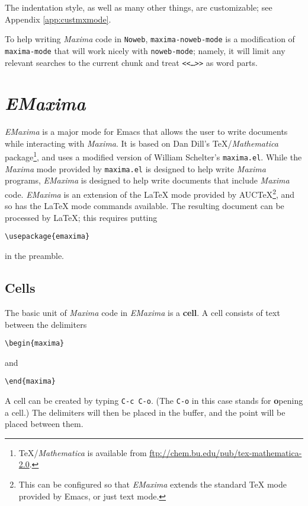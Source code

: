 \documentclass{article}
\newcommand{\emx}{\textsl{\sffamily EMaxima}}
\newcommand{\mx}{\textsl{\sffamily Maxima}}
\newcommand{\hyph}{-\hspace{0pt}}
\begin{document}
The indentation style, as well as many other things, are customizable;
see Appendix \ref{app:custmxmode}.

To help writing \mx{} code in \texttt{Noweb},
\texttt{maxima\hyph{}noweb\hyph{}mode} is a modification of \texttt{maxima\hyph{}mode}
that will work nicely with \texttt{noweb\hyph{}mode}; namely, it will limit
any relevant searches to the current chunk and treat
\texttt{<<\ldots>>} as word parts.

\section{\emx}

\emx{} is a major mode for Emacs that allows the user to write
documents while interacting with \mx.  It is based on Dan Dill's
\TeX{}/\textit{Mathematica} package\footnote{\TeX/\textit{Mathematica}
  is available from \url{ftp://chem.bu.edu/pub/tex-mathematica-2.0}.},
and uses a modified version of William Schelter's \texttt{maxima.el}.
While the \mx{} mode provided by \texttt{maxima.el} is designed to
help write \mx{} programs, \emx{} is designed to help write documents
that include \mx{} code.  \emx{} is an extension of the \LaTeX{} mode
provided by AUC\TeX{}\footnote{This can be configured so that \emx{}
  extends the standard \TeX{} mode provided by Emacs, or just text
  mode.}, and so has the \LaTeX{} mode commands available.  The
resulting document can be processed by \LaTeX{}; this requires putting
\begin{verbatim}
\usepackage{emaxima}
\end{verbatim}
\noindent
in the preamble.

\subsection{Cells}

The basic unit of \mx{} code in \emx{} is a \textbf{cell}.  A cell
consists of text between the delimiters
\begin{verbatim}
\begin{maxima}
\end{verbatim}
\noindent
and
\begin{verbatim}
\end{maxima}
\end{verbatim}
\noindent
A cell can be created by typing \texttt{C-c C-o}.  (The \texttt{C-o} in this
case stands for \textbf{o}pening a cell.)  The delimiters will then be
placed in the buffer, and the point will be placed between them.
\end{document}
